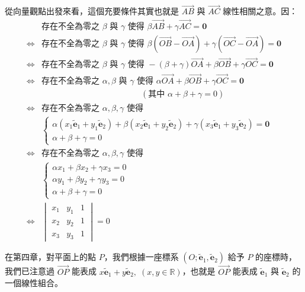 從向量觀點出發來看，這個充要條件其實也就是 $\vec{AB}$ 與 $\vec{AC}$ 線性相關之意。因：
\begin{align*}
&\text{存在不全為零之 } \beta \text{ 與 } \gamma \text{ 使得 } \beta \vec{AB} + \gamma \vec{AC} = \mathbf{0} \\
\Longleftrightarrow &\text{存在不全為零之 } \beta \text{ 與 } \gamma \text{ 使得 } \beta(\vec{OB} - \vec{OA}) + \gamma(\vec{OC} - \vec{OA}) = \mathbf{0} \\
\Longleftrightarrow &\text{存在不全為零之 } \beta \text{ 與 } \gamma \text{ 使得 } -(\beta + \gamma)\vec{OA} + \beta \vec{OB} + \gamma \vec{OC} = \mathbf{0} \\
\Longleftrightarrow &\text{存在不全為零之 } \alpha, \beta \text{ 與 } \gamma \text{ 使得 } \alpha \vec{OA} + \beta \vec{OB} + \gamma \vec{OC} = \mathbf{0} \\
&\hspace{12em} (\text{其中 } \alpha + \beta + \gamma = 0) \\
\Longleftrightarrow &\text{存在不全為零之 } \alpha, \beta, \gamma \text{ 使得 } \\
&\begin{cases}
\alpha(x_1 \tilde{\mathbf{e}}_1 + y_1 \tilde{\mathbf{e}}_2) + \beta(x_2 \tilde{\mathbf{e}}_1 + y_2 \tilde{\mathbf{e}}_2) + \gamma(x_3 \tilde{\mathbf{e}}_1 + y_3 \tilde{\mathbf{e}}_2) = \mathbf{0} \\
\alpha + \beta + \gamma = 0
\end{cases} \\
\Longleftrightarrow &\text{存在不全為零之 } \alpha, \beta, \gamma \text{ 使得 } \\
&\begin{cases}
\alpha x_1 + \beta x_2 + \gamma x_3 = 0 \\
\alpha y_1 + \beta y_2 + \gamma y_3 = 0 \\
\alpha + \beta + \gamma = 0
\end{cases} \\
\Longleftrightarrow &\begin{vmatrix} x_1 & y_1 & 1 \\ x_2 & y_2 & 1 \\ x_3 & y_3 & 1 \end{vmatrix} = 0
\end{align*}

在第四章，對平面上的點 $P$，我們根據一座標系 $(O; \tilde{\mathbf{e}}_1, \tilde{\mathbf{e}}_2)$ 給予 $P$ 的座標時，我們已注意過 $\vec{OP}$ 能表成 $x\tilde{\mathbf{e}}_1 + y\tilde{\mathbf{e}}_2,\; (x, y \in \mathbb{R})$，也就是 $\vec{OP}$ 能表成 $\tilde{\mathbf{e}}_1$ 與 $\tilde{\mathbf{e}}_2$ 的一個線性組合。

